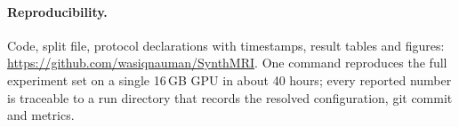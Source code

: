 \documentclass[10pt,a4paper]{article}
\begin{document}
\paragraph{Reproducibility.} Code, split file, protocol declarations with timestamps, result tables and figures: \url{https://github.com/wasiqnauman/SynthMRI}. One command reproduces the full experiment set on a single 16\,GB GPU in about 40 hours; every reported number is traceable to a run directory that records the resolved configuration, git commit and metrics.



\end{document}
